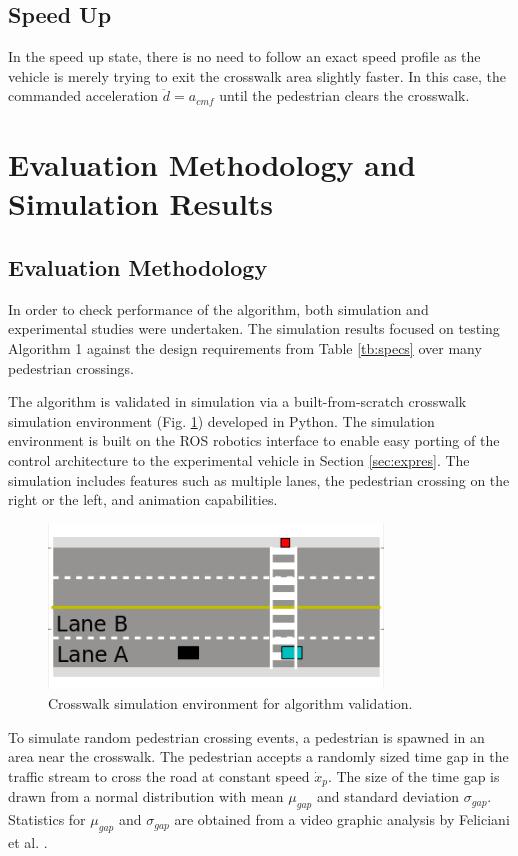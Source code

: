 \documentclass[letterpaper, 10 pt, conference]{ieeeconf}  %
\begin{document}
\subsection{Speed Up}

In the speed up state, there is no need to follow an exact speed profile as the vehicle is merely trying to exit the crosswalk area slightly faster. In this case, the commanded acceleration $\ddot{d} = a_{cmf}$ until the pedestrian clears the crosswalk. 

\section{Evaluation Methodology and Simulation Results}

\subsection{Evaluation Methodology}

In order to check performance of the algorithm, both simulation and experimental studies were undertaken. The simulation results focused on testing Algorithm 1 against the design requirements from Table \ref{tb:specs} over many pedestrian crossings. 

The algorithm is validated in simulation via a built-from-scratch crosswalk simulation environment (Fig. \ref{fig:simFramework}) developed in Python. The simulation environment is built on the ROS \cite{ROS} robotics interface to enable easy porting of the control architecture to the experimental vehicle in Section \ref{sec:expres}. The simulation includes features such as multiple lanes, the pedestrian crossing on the right or the left, and animation capabilities.    

\begin{figure}
\centering
\includegraphics[width=3.5in]{figures/simFramework.png}
\caption{Crosswalk simulation environment for algorithm validation.}
\label{fig:simFramework}
\end{figure}

To simulate random pedestrian crossing events, a pedestrian is spawned in an area near the crosswalk. The pedestrian accepts a randomly sized time gap in the traffic stream to cross the road at constant speed $\dot{x}_p$. The size of the time gap is drawn from a normal distribution with mean $\mu_{gap}$ and standard deviation $\sigma_{gap}$. Statistics for $\mu_{gap}$ and $\sigma_{gap}$ are obtained from a video graphic analysis by Feliciani et al. \cite{Feliciani2017}. 
\end{document}
